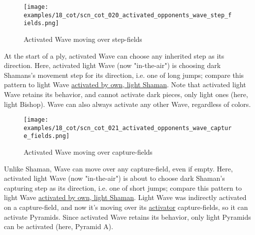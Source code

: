 \clearpage %

\vspace*{-2.3\baselineskip}
\noindent
\begin{figure}[!h]
\texttt{[image: examples/18\_cot/scn\_cot\_020\_activated\_opponents\_wave\_step\_fields.png]}
\vspace*{-1.4\baselineskip}
\caption{Activated Wave moving over step-fields}
\label{fig:scn_cot_020_activated_opponents_wave_step_fields}
\end{figure}

\vspace*{-0.5\baselineskip}
At the start of a ply, activated Wave can choose any inherited step as its direction.
Here, activated light Wave (now "in-the-air") is choosing dark Shamans's movement
step for its direction, i.e. one of long jumps; compare this pattern to light Wave
\hyperref[fig:scn_cot_014_capture_activated_wave_step_fields]{activated by own, light Shaman}.\newline
\indent
Note that activated light Wave retains its behavior, and cannot activate dark
pieces, only light ones (here, light Bishop). Wave can also always activate any
other Wave, regardless of colors.

\clearpage %

\vspace*{-2.3\baselineskip}
\noindent
\begin{figure}[!h]
\texttt{[image: examples/18\_cot/scn\_cot\_021\_activated\_opponents\_wave\_capture\_fields.png]}
\vspace*{-1.4\baselineskip}
\caption{Activated Wave moving over capture-fields}
\label{fig:scn_cot_021_activated_opponents_wave_capture_fields}
\end{figure}

\vspace*{-0.5\baselineskip}
Unlike Shaman, Wave can move over any capture-field, even if empty. Here, activated
light Wave (now "in-the-air") is about to choose dark Shaman's capturing step as its
direction, i.e. one of short jumps; compare this pattern to light Wave
\hyperref[fig:scn_cot_015_capture_activated_wave_capture_fields]{activated by own, light Shaman}.\newline
\indent
Light Wave was indirectly activated on a capture-field, and now it's moving over
its \hyperref[sec:Terms/Activator]{activator} capture-fields, so it can activate
Pyramids. Since activated Wave retains its behavior, only light Pyramids can be
activated (here, Pyramid A).


